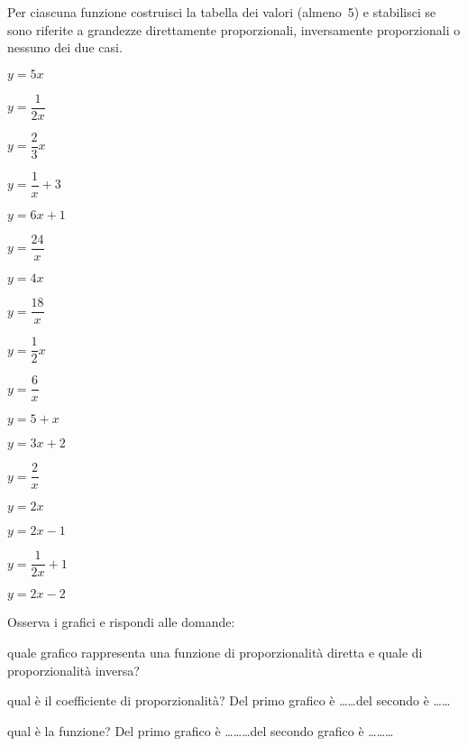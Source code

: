 \begin{esercizio}
 \label{ese:3.124}
Per ciascuna funzione costruisci la tabella dei valori (almeno~5) e stabilisci 
se sono riferite a grandezze direttamente proporzionali, inversamente 
proporzionali o nessuno dei due casi.

\begin{multicols}{3}
\begin{enumeratea}
\spazielenx
\item \(y=5x\)
\item \(y=\dfrac{1}{2x}\)
\item \(y=\dfrac{2}{3}x\)
\item \(y=\dfrac{1}{x}+3\)
\item \(y=6x+1\)
\item \(y=\dfrac{24}{x}\)
\item \(y=4x\)
\item \(y=\dfrac{18}{x}\)
\item \(y=\dfrac{1}{2}x\)
\item \(y=\dfrac{6}{x}\)
\item \(y=5+x\)
\item \(y=3x+2\)
\item \(y=\dfrac{2}{x}\)
\item \(y=2x\)
\item \(y=2x-1\)
\item \(y=\dfrac{1}{2x}+1\)
\item \(y=2x-2\)
\end{enumeratea}
\end{multicols}
\end{esercizio}


\begin{esercizio}
 \label{ese:3.125}
Osserva i grafici e rispondi alle domande:
\begin{center}
 \scalebox{.7}{}
%  
\end{center}
\begin{enumeratea}
\item quale grafico rappresenta una funzione di proporzionalità diretta e 
quale di proporzionalità inversa?
\item qual è il coefficiente di proporzionalità? Del primo grafico è 
\ldots\ldots del secondo è \ldots\ldots
\item qual è la funzione? Del primo grafico è \ldots\ldots\ldots del secondo 
grafico è \ldots\ldots\ldots
\end{enumeratea}
\end{esercizio}

